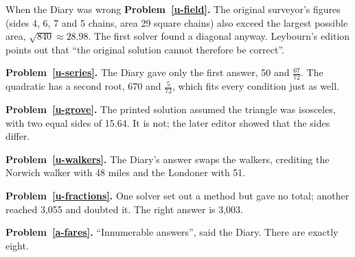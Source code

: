 \documentclass[11pt,a4paper]{article}
\begin{document}
\begin{diarynote}{When the Diary was wrong}
\textbf{Problem~\ref{u-field}.} The original surveyor's figures (sides 4, 6, 7 and 5
chains, area 29 square chains) also exceed the largest possible area, $\sqrt{840}\approx
28.98$. The first solver found a diagonal anyway. Leybourn's edition points out that
``the original solution cannot therefore be correct''.

\textbf{Problem~\ref{u-series}.} The Diary gave only the first answer, 50 and
$\tfrac{67}{72}$. The quadratic has a second root, 670 and $\tfrac5{72}$, which fits every
condition just as well.

\textbf{Problem~\ref{u-grove}.} The printed solution assumed the triangle was isosceles,
with two equal sides of 15.64. It is not; the later editor showed that the sides differ.

\textbf{Problem~\ref{u-walkers}.} The Diary's answer swaps the walkers, crediting the
Norwich walker with 48 miles and the Londoner with 51.

\textbf{Problem~\ref{u-fractions}.} One solver set out a method but gave no total;
another reached 3,055 and doubted it. The right answer is 3,003.

\textbf{Problem~\ref{a-fares}.} ``Innumerable answers'', said the Diary. There are
exactly eight.
\end{diarynote}
\end{document}
